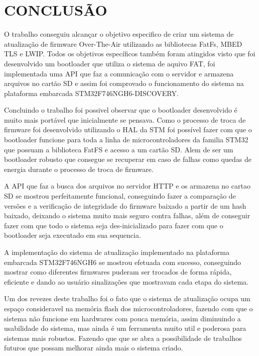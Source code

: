 
\chapter{CONCLUSÃO}
\label{chap:conclusao}
O trabalho conseguiu alcançar o objetivo especifico de criar um sistema de atualização de firmware Over-The-Air utilizando as bibliotecas FatFs, MBED TLS e LWIP. Todos os objetivos específicos também foram atingidos visto que foi desenvolvido um bootloader que utiliza o sistema de aquivo FAT, foi implementada uma API que faz a comunicação com o servidor e armazena arquivos no cartão SD e assim foi comprovado o funcionamento do sistema na plataforma embarcada STM32F746NGH6-DISCOVERY.

Concluindo o trabalho foi possivel observar que o bootloader desenvolvido é muito mais portável que inicialmente se pensava. Como o processo de troca de firmware foi desenvolvido utilizando o HAL da STM foi possível fazer com que o bootloader funcione para toda a linha de microcontroladores da familia STM32 que possuam a biblioteca FatFS e acesso a um cartão SD. Alem de ser um bootloader robusto que consegue se recuperar em caso de falhas como quedas de energia durante o processo de troca de firmware.

A API que faz a busca dos arquivos no servidor HTTP e os armazena no cartao SD se mostrou perfeitamente funcional, conseguindo fazer a comparação de versões e a verificação de integridade do firmware baixado a partir de um hash baixado, deixando o sistema muito mais seguro contra falhas, além de conseguir fazer com que todo o sistema seja des-inicializado para fazer com que o bootloader seja executado em sua sequencia.

A implementação do sistema de atualização implementado na plataforma embarcada STM32F746NGH6 se mostrou efetuada com sucesso, conseguindo mostrar como diferentes firmwares puderam ser trocados de forma rápida, eficiente e dando ao usuário sinalizações que mostravam cada etapa do sistema.

Um dos revezes deste trabalho foi o fato que o sistema de atualização ocupa um espaço consideravel na memória flash dos microcontroladores, fazendo com que o sistema não funcione em hardwares com pouca memória, assim diminuindo a usabilidade do sistema, mas ainda é um ferramenta muito util e poderosa para sistemas mais robustos. Fazendo que que se abra a possibilidade de trabalhos futuros que possam melhorar ainda mais o sistema criado.
